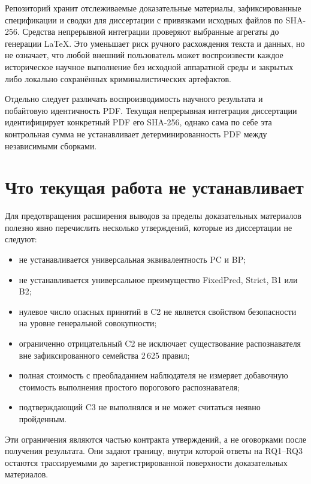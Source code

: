 Репозиторий хранит отслеживаемые доказательные материалы, зафиксированные
спецификации и сводки для диссертации с привязками исходных файлов по SHA-256.
Средства непрерывной интеграции проверяют выбранные агрегаты до генерации
LaTeX. Это уменьшает риск ручного расхождения текста и данных, но не означает,
что любой внешний пользователь может воспроизвести каждое историческое научное
выполнение без исходной аппаратной среды и закрытых либо локально сохранённых
криминалистических артефактов.

Отдельно следует различать воспроизводимость научного результата и побайтовую
идентичность PDF. Текущая непрерывная интеграция диссертации идентифицирует
конкретный PDF его SHA-256, однако сама по себе эта контрольная сумма не
устанавливает детерминированность PDF между независимыми сборками.

\section{Что текущая работа не устанавливает}
\label{sec:discussion-nonclaims}

Для предотвращения расширения выводов за пределы доказательных материалов
полезно явно перечислить несколько утверждений, которые из диссертации не
следуют:

\begin{itemize}
  \item не устанавливается универсальная эквивалентность PC и BP;
  \item не устанавливается универсальное преимущество FixedPred, Strict, B1
        или B2;
  \item нулевое число опасных принятий в C2 не является свойством безопасности
        на уровне генеральной совокупности;
  \item ограниченно отрицательный C2 не исключает существование распознавателя
        вне зафиксированного семейства 2\,625 правил;
  \item полная стоимость с преобладанием наблюдателя не измеряет добавочную
        стоимость выполнения простого порогового распознавателя;
  \item подтверждающий C3 не выполнялся и не может считаться неявно пройденным.
\end{itemize}

Эти ограничения являются частью контракта утверждений, а не оговорками после
получения результата. Они задают границу, внутри которой ответы на RQ1--RQ3
остаются трассируемыми до зарегистрированной поверхности доказательных
материалов.

